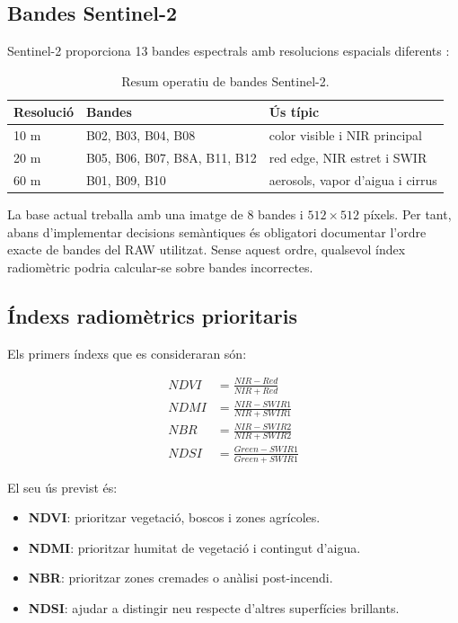 \documentclass[11pt,a4paper]{article}
\begin{document}
\subsection{Bandes Sentinel-2}

Sentinel-2 proporciona 13 bandes espectrals amb resolucions espacials diferents \cite{sentinelhub}:

\begin{table}[H]
\centering
\begin{tabular}{lll}
\toprule
\textbf{Resolució} & \textbf{Bandes} & \textbf{Ús típic} \\
\midrule
10 m & B02, B03, B04, B08 & color visible i NIR principal \\
20 m & B05, B06, B07, B8A, B11, B12 & red edge, NIR estret i SWIR \\
60 m & B01, B09, B10 & aerosols, vapor d'aigua i cirrus \\
\bottomrule
\end{tabular}
\caption{Resum operatiu de bandes Sentinel-2.}
\end{table}

La base actual treballa amb una imatge de 8 bandes i $512 \times 512$ píxels. Per tant, abans d'implementar decisions semàntiques és obligatori documentar l'ordre exacte de bandes del RAW utilitzat. Sense aquest ordre, qualsevol índex radiomètric podria calcular-se sobre bandes incorrectes.

\subsection{Índexs radiomètrics prioritaris}

Els primers índexs que es consideraran són:

\begin{align}
  NDVI &= \frac{NIR - Red}{NIR + Red} \\
  NDMI &= \frac{NIR - SWIR1}{NIR + SWIR1} \\
  NBR  &= \frac{NIR - SWIR2}{NIR + SWIR2} \\
  NDSI &= \frac{Green - SWIR1}{Green + SWIR1}
\end{align}

El seu ús previst és:
\begin{itemize}
  \item \textbf{NDVI}: prioritzar vegetació, boscos i zones agrícoles.
  \item \textbf{NDMI}: prioritzar humitat de vegetació i contingut d'aigua.
  \item \textbf{NBR}: prioritzar zones cremades o anàlisi post-incendi.
  \item \textbf{NDSI}: ajudar a distingir neu respecte d'altres superfícies brillants.
\end{itemize}
\end{document}
